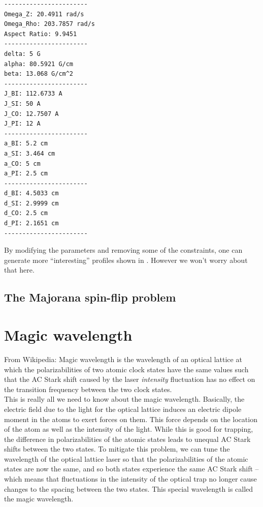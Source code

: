 \documentclass{book}
\theoremstyle{definition}
\begin{document}
\begin{lstlisting}
-----------------------
Omega_Z: 20.4911 rad/s
Omega_Rho: 203.7857 rad/s
Aspect Ratio: 9.9451
-----------------------
delta: 5 G
alpha: 80.5921 G/cm
beta: 13.068 G/cm^2
-----------------------
J_BI: 112.6733 A
J_SI: 50 A
J_CO: 12.7507 A
J_PI: 12 A
-----------------------
a_BI: 5.2 cm
a_SI: 3.464 cm
a_CO: 5 cm
a_PI: 2.5 cm
-----------------------
d_BI: 4.5033 cm
d_SI: 2.9999 cm
d_CO: 2.5 cm
d_PI: 2.1651 cm
-----------------------
\end{lstlisting}

By modifying the parameters and removing some of the constraints, one can generate more ``interesting'' profiles shown in \cite{allcoil}. However we won't worry about that here. 




\subsection*{The Majorana spin-flip problem}

















\section*{Magic wavelength}



From Wikipedia: Magic wavelength is the wavelength of an optical lattice at which the polarizabilities of two atomic clock states have the same values such that the AC Stark shift caused by the laser \textit{intensity} fluctuation has no effect on the transition frequency between the two clock states.\\


This is really all we need to know about the magic wavelength. Basically, the electric field due to the light for the optical lattice induces an electric dipole moment in the atoms to exert forces on them. This force depends on the location of the atom as well as the intensity of the light. While this is good for trapping, the difference in polarizabilities of the atomic states leads to unequal AC Stark shifts between the two states. To mitigate this problem, we can tune the wavelength of the optical lattice laser so that the polarizabilities of the atomic states are now the same, and so both states experience the same AC Stark shift -- which means that fluctuations in the intensity of the optical trap no longer cause changes to the spacing between the two states. This special wavelength is called the magic wavelength. 
\end{document}
